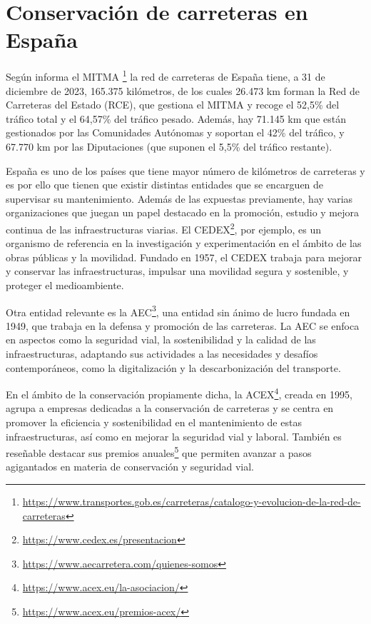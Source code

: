 \section{Conservación de carreteras en España}

Según informa el \ac{MITMA} \footnote{\url{https://www.transportes.gob.es/carreteras/catalogo-y-evolucion-de-la-red-de-carreteras}} la red de carreteras de España tiene, a 31 de diciembre de 2023, 165.375 kilómetros, de los cuales 26.473 km forman la Red de Carreteras del Estado (RCE), que gestiona el \acs{MITMA} y recoge el 52,5\% del tráfico total y el 64,57\% del tráfico pesado. Además, hay 71.145 km que están gestionados por las Comunidades Autónomas y soportan el 42\% del tráfico, y 67.770 km por las Diputaciones (que suponen el 5,5\% del tráfico restante).

España es uno de los países que tiene mayor número de kilómetros de carreteras y es por ello que tienen que existir distintas entidades que se encarguen de supervisar su mantenimiento. Además de las expuestas previamente, hay varias organizaciones que juegan un papel destacado en la promoción, estudio y mejora continua de las infraestructuras viarias. El \ac{CEDEX}\footnote{\url{https://www.cedex.es/presentacion}}, por ejemplo, es un organismo de referencia en la investigación y experimentación en el ámbito de las obras públicas y la movilidad. Fundado en 1957, el \acs{CEDEX} trabaja para mejorar y conservar las infraestructuras, impulsar una movilidad segura y sostenible, y proteger el medioambiente.

Otra entidad relevante es la \ac{AEC}\footnote{\url{https://www.aecarretera.com/quienes-somos}}, una entidad sin ánimo de lucro fundada en 1949, que trabaja en la defensa y promoción de las carreteras. La \acs{AEC} se enfoca en aspectos como la seguridad vial, la sostenibilidad y la calidad de las infraestructuras, adaptando sus actividades a las necesidades y desafíos contemporáneos, como la digitalización y la descarbonización del transporte.

En el ámbito de la conservación propiamente dicha, la \ac{ACEX}\footnote{\url{https://www.acex.eu/la-asociacion/}}, creada en 1995, agrupa a empresas dedicadas a la conservación de carreteras y se centra en promover la eficiencia y sostenibilidad en el mantenimiento de estas infraestructuras, así como en mejorar la seguridad vial y laboral. También es reseñable destacar sus premios anuales\footnote{\url{https://www.acex.eu/premios-acex/}} que permiten avanzar a pasos agigantados en materia de conservación y seguridad vial.


